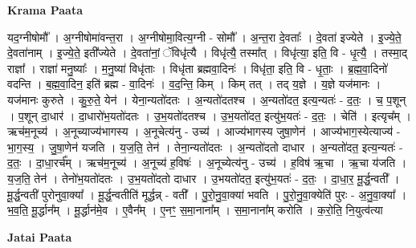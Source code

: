 \documentclass[17pt]{extarticle}
\begin{document}
\textbf{Krama Paata} \newline

यद॒ग्नीषोमौ᳚ । अ॒ग्नीषोमा॑वन्त॒रा । अ॒ग्नीषोमा॒वित्य॒ग्नी - सोमौ᳚ । अ॒न्त॒रा दे॒वताः᳚ । दे॒वता॑ इज्येते । इ॒ज्ये॒ते॒ दे॒वता॑नाम् । इ॒ज्ये॒ते॒ इती᳚ज्येते । दे॒वता॑नां॒ ॅविधृ॑त्यै । विधृ॑त्यै॒ तस्मा᳚त् । विधृ॑त्या॒ इति॒ वि - धृ॒त्यै॒ । तस्मा॒द् राज्ञा᳚ । राज्ञा॑ मनु॒ष्याः᳚ । म॒नु॒ष्या॑ विधृ॑ताः । विधृ॑ता ब्रह्मवा॒दिनः॑ । विधृ॑ता॒ इति॒ वि - धृ॒ताः॒ । ब्र॒ह्म॒वा॒दिनो॑ वदन्ति । ब॒ह्म॒वा॒दिन॒ इति॑ ब्रह्म - वा॒दिनः॑ । व॒द॒न्ति॒ किम् । किम् तत् । तद् य॒ज्ञे । य॒ज्ञे यज॑मानः । यज॑मानः कुरुते । कु॒रु॒ते॒ येन॑ । येना॒न्यतो॑दतः । अ॒न्यतो॑दतश्च । अ॒न्यतो॑दत॒ इत्य॒न्यतः॑ - द॒तः॒ । च॒ प॒शून् । प॒शून् दा॒धार॑ । दा॒धारो॑भ॒यतो॑दतः । उ॒भ॒यतो॑दतश्च । उ॒भ॒यतो॑दत॒ इत्यु॑भ॒यतः॑ - द॒तः॒ । चेति॑ । इत्यृच᳚म् । ऋच॑म॒नूच्य॑ । अ॒नूच्याज्य॑भागस्य । अ॒नूचेत्य॑नु - उच्य॑ । आज्य॑भागस्य जुषा॒णेन॑ । आज्य॑भाग॒स्येत्याज्य॑ - भा॒ग॒स्य॒ । जु॒षा॒णेन॑ यजति । य॒ज॒ति॒ तेन॑ । तेना॒न्यतो॑दतः । अ॒न्यतो॑दतो दाधार । अ॒न्यतो॑दत॒ इत्य॒न्यतः॑ - द॒तः॒ । दा॒धा॒रर्च᳚म् । ऋच॑म॒नूच्य॑ । अ॒नूच्य॑ ह॒विषः॑ । अ॒नूच्येत्य॑नु - उच्य॑ । ह॒विष॑ ऋ॒चा । ऋ॒चा य॑जति । य॒ज॒ति॒ तेन॑ । तेनो॑भ॒यतो॑दतः । उ॒भ॒यतो॑दतो दाधार । उ॒भयतो॑दत॒ इत्यु॑भ॒यतः॑ - द॒तः॒ । दा॒धा॒र॒ मू॒र्द्ध॒न्वती᳚ । मू॒र्द्ध॒न्वती॑ पुरोनुवा॒क्या᳚ । मू॒र्द्ध॒न्वतीति॑ मूर्द्धन्न् - वती᳚ । पु॒रो॒नु॒वा॒क्या॑ भवति । पु॒रो॒नु॒वा॒क्येति॑ पुरः - अ॒नु॒वा॒क्या᳚ । भ॒व॒ति॒ मू॒र्द्धान᳚म् । मू॒र्द्धान॑मे॒व । ए॒वैन᳚म् । ए॒नꣳ॒॒ स॒मा॒नाना᳚म् । स॒मा॒नाना᳚म् करोति । क॒रो॒ति॒ नि॒युत्व॑त्या \newline

\textbf{Jatai Paata} \newline
\end{document}
